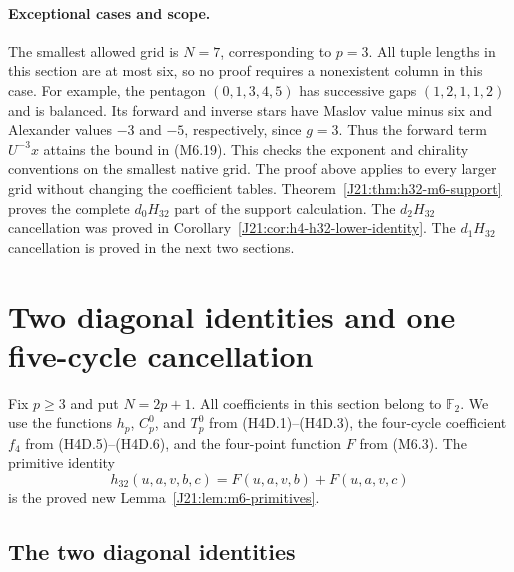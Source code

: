 \documentclass[11pt,oneside]{report}
\theoremstyle{definition}
\numberwithin{equation}{section}
\begin{document}
\paragraph{Exceptional cases and scope.}
The smallest allowed grid is $N=7$, corresponding to $p=3$.
All tuple lengths in this section are at most six, so no proof
requires a nonexistent column in this case.
For example, the pentagon $(0,1,3,4,5)$ has successive gaps
$(1,2,1,1,2)$ and is balanced. Its forward and inverse stars have
Maslov value minus six and Alexander values $-3$ and $-5$,
respectively, since $g=3$.
Thus the forward term $U^{-3}x$ attains the bound in (M6.19).
This checks the exponent and chirality conventions on the smallest
native grid. The proof above applies to every larger grid without
changing the coefficient tables.
Theorem~\ref{J21:thm:h32-m6-support} proves the complete $d_0H_{32}$
part of the support calculation. The $d_2H_{32}$ cancellation was proved in
Corollary~\ref{J21:cor:h4-h32-lower-identity}. The $d_1H_{32}$ cancellation
is proved in the next two sections.



\section{Two diagonal identities and one five-cycle cancellation}
\label{J21:sec:h4-m4-A}

Fix $p\geq3$ and put $N=2p+1$.
All coefficients in this section belong to $\mathbb F _2$.
We use the functions $h_p$, $C_p^0$, and $T_p^0$ from
(H4D.1)--(H4D.3), the four-cycle coefficient $f_4$ from
(H4D.5)--(H4D.6), and the four-point function $F$ from (M6.3).
The primitive identity
\[
 h_{32}(u,a,v,b,c)=F(u,a,v,b)+F(u,a,v,c)
 \tag{M4A.1}
\]
is the proved new Lemma~\ref{J21:lem:m6-primitives}.

\subsection{The two diagonal identities}
\end{document}
